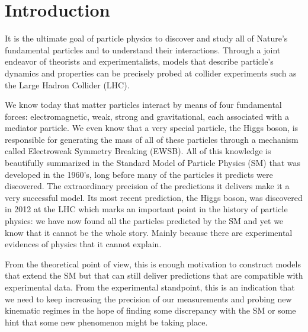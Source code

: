
\chapter{Introduction}
\label{chapter:introduction}

It is the ultimate goal of particle physics to discover and study all of Nature's fundamental particles and to understand their interactions. Through a joint endeavor of theorists and experimentalists, models that describe particle's dynamics and properties can be precisely probed at collider experiments such as the Large Hadron Collider (LHC). 

We know today that matter particles interact by means of four fundamental forces: electromagnetic, weak, strong and gravitational, each associated with a mediator particle. We even know that a very special particle, the Higgs boson, is responsible for generating the mass of all of these particles through a mechanism called Electroweak Symmetry Breaking (EWSB). All of this knowledge is beautifully summarized in the Standard Model of Particle Physics (SM) that was developed in the 1960's, long before many of the particles it predicts were discovered. The extraordinary precision of the predictions it delivers make it a very successful model. Its most recent prediction, the Higgs boson, was discovered in 2012 at the LHC which marks an important point in the history of particle physics: we have now found all the particles predicted by the SM and yet we know that it cannot be the whole story. Mainly because there are experimental evidences of physics that it cannot explain.

From the theoretical point of view, this is enough motivation to construct models that extend the SM but that can still deliver predictions that are compatible with experimental data. From the experimental standpoint, this is an indication that we need to keep increasing the precision of our measurements and probing new kinematic regimes in the hope of finding some discrepancy with the SM or some hint that some new phenomenon might be taking place.

